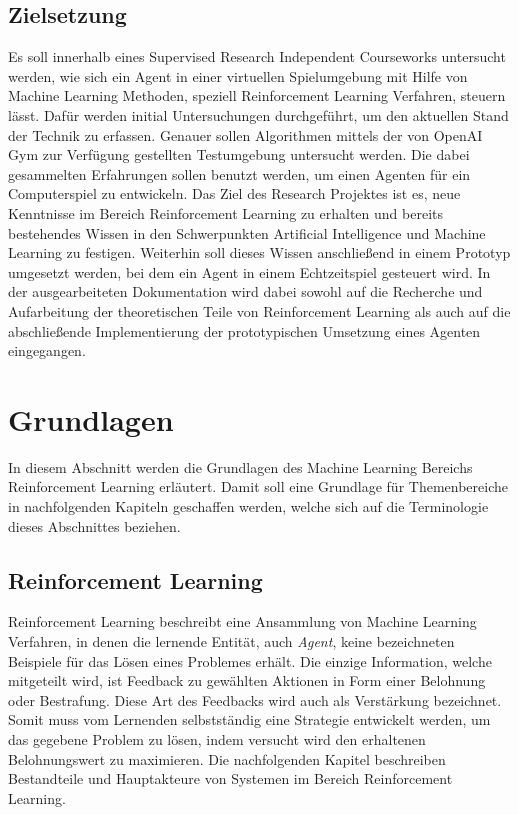 \documentclass[11pt]{scrartcl}
\begin{document}
\subsection{Zielsetzung}
Es soll innerhalb eines Supervised Research Independent Courseworks untersucht werden, wie
sich ein Agent in einer virtuellen Spielumgebung mit Hilfe von Machine Learning Methoden,
speziell Reinforcement Learning Verfahren, steuern lässt. Dafür werden initial
Untersuchungen durchgeführt, um den aktuellen Stand der Technik zu erfassen. Genauer
sollen Algorithmen mittels der von OpenAI Gym zur Verfügung gestellten Testumgebung
untersucht werden. Die dabei gesammelten Erfahrungen sollen benutzt werden, um einen
Agenten für ein Computerspiel zu entwickeln. Das Ziel des Research Projektes ist es, neue
Kenntnisse im Bereich Reinforcement Learning zu erhalten und bereits bestehendes Wissen in
den Schwerpunkten Artificial Intelligence und Machine Learning zu festigen. Weiterhin soll
dieses Wissen anschließend in einem Prototyp umgesetzt werden, bei dem ein Agent in einem
Echtzeitspiel gesteuert wird. In der ausgearbeiteten Dokumentation wird dabei sowohl auf die
Recherche und Aufarbeitung der theoretischen Teile von Reinforcement Learning als auch auf
die abschließende Implementierung der prototypischen Umsetzung eines Agenten eingegangen.
\newpage

\section{Grundlagen}
In diesem Abschnitt werden die Grundlagen des Machine Learning Bereichs Reinforcement Learning 
erläutert. Damit soll eine Grundlage für Themenbereiche in nachfolgenden Kapiteln geschaffen
werden, welche sich auf die Terminologie dieses Abschnittes beziehen.


\subsection{Reinforcement Learning}
Reinforcement Learning beschreibt eine Ansammlung von Machine Learning Verfahren, in denen die 
lernende Entität, auch \textit{Agent}, keine bezeichneten Beispiele für das Lösen eines Problemes 
erhält. Die einzige Information, welche mitgeteilt wird, ist Feedback zu gewählten Aktionen in Form
einer Belohnung oder Bestrafung. Diese Art des Feedbacks wird auch als Verstärkung bezeichnet.
Somit muss vom Lernenden selbstständig eine Strategie entwickelt werden, um das gegebene
Problem zu lösen, indem versucht wird den erhaltenen Belohnungswert zu maximieren. Die nachfolgenden
Kapitel beschreiben Bestandteile und Hauptakteure von Systemen im Bereich Reinforcement Learning.
\end{document}
